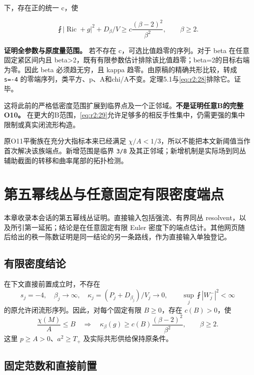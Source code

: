 \documentclass[UTF8,11pt,openany,oneside,fontset=none]{ctexbook}
\begin{document}
下，存在正的统一 c，使

\[
 \boxed{\fint|\operatorname{Ric}+g|^2+D_\beta/V
 \ge c\frac{(\beta-2)^2}{\beta^2},\qquad\beta\ge2.}
 \tag{2.31}\label{eq:r2:31}
\]

\textbf{证明全参数与原度量范围。} 若不存在 c，可选比值趋零的序列。对于 beta 在任意固定紧区间内且 beta\textgreater2，既有有限参数估计排除该比值趋零；beta=2的目标右端为零。因此 beta 必须趋无穷，且 kappa 趋零。由原稿的精确共形比较，转成 \texttt{s=-4} 的零端序列，类平方、p、A和chi/A不变。定理5.1与\eqref{eq:r2:28}排除它。证毕。

这将此前的严格低密度范围扩展到临界点及一个正邻域。\textbf{不是证明任意B的完整O10。} 在更大的B范围，\eqref{eq:r2:29}允许足够多的相反手性集中，仍需更强的集中限制或真实闭流形构造。

原O11平衡族在充分大指标本来已经满足 \(\chi/A<1/3\)，所以不能把本文新阈值当作首次解决该族端点。新增范围是临界 \texttt{3/8} 及其正邻域；新增机制是实际场到同丛辅助截面的转移和曲率尾部的拓扑检测。


\chapter{第五幂线丛与任意固定有限密度端点}\label{chapter:3}
本章收录本会话的第五幂线丛证明。直接输入包括强流、有界同丛 resolvent，以及所引第一延拓；结论是在任意固定有限 Euler 密度下的端点估计。其他网页随后给出的秩一陈数证明是同一结论的另一条路线，作为直接输入单独登记。\cite{R03,Strong,Prolongation,FD}

\section{有限密度结论}\label{ch3:ux6709ux9650ux5bc6ux5ea6ux7ed3ux8bba}

在下文直接前置成立时，不存在 \[
s_j=-4,\quad\beta_j\to\infty,\quad
\kappa_j=(P_j+D_{\beta_j})/V_j\to0,
\qquad \sup_j\fint|W_j^-|^2<\infty
\tag{3.1}\label{eq:r3:1}
\] 的原允许闭流形序列。因此，对每个固定有限 \(B\ge0\)，存在 \(c(B)>0\)，使 \[
\frac{\chi(M)}A\le B\quad\Longrightarrow\quad
\kappa_\beta(g)\ge c(B)\frac{(\beta-2)^2}{\beta^2},\qquad\beta\ge2.
\tag{3.2}\label{eq:r3:2}
\] 这里 \(p\ge A>0\)、\(a^2\ge T_+\) 及实际共形供给保持原条件。

\section{固定范数和直接前置}\label{ch3:ux56faux5b9aux8303ux6570ux548cux76f4ux63a5ux524dux7f6e}
\end{document}

